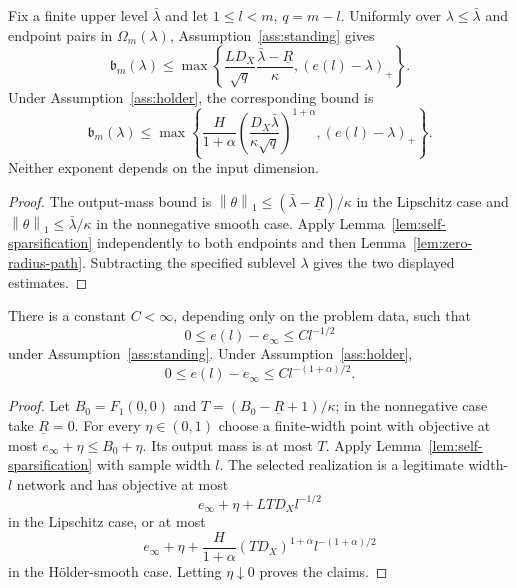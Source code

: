\documentclass[smallextended,envcountsect]{svjour3}
\newcommand{\norm}[1]{\left\lVert #1 \right\rVert}
\newcommand{\SubBar}{\mathfrak b}
\begin{document}
\begin{theorem}\label{thm:dimension-free-finite}
Fix a finite upper level $\bar\lambda$ and let $1\le l<m$, $q=m-l$.
Uniformly over $\lambda\le\bar\lambda$ and endpoint pairs in
$\Omega_m(\lambda)$, Assumption~\ref{ass:standing} gives
\begin{equation}
 \SubBar_m(\lambda)
 \le \max\left\{
 \frac{LD_X}{\sqrt q}\frac{\bar\lambda-\underline R}{\kappa},
 (e(l)-\lambda)_+
 \right\}.
 \label{eq:dimension-free-lipschitz-finite}
\end{equation}
Under Assumption~\ref{ass:holder}, the corresponding bound is
\begin{equation}
 \SubBar_m(\lambda)
 \le \max\left\{
 \frac{H}{1+\alpha}
 \left(\frac{D_X\bar\lambda}{\kappa\sqrt q}\right)^{1+\alpha},
 (e(l)-\lambda)_+
 \right\}.
 \label{eq:dimension-free-holder-finite}
\end{equation}
Neither exponent depends on the input dimension.
\end{theorem}

\begin{proof}
The output-mass bound is
$\norm{\theta}_1\le(\bar\lambda-\underline R)/\kappa$ in the Lipschitz case
and $\norm{\theta}_1\le\bar\lambda/\kappa$ in the nonnegative smooth case.
Apply Lemma~\ref{lem:self-sparsification} independently to both endpoints and
then Lemma~\ref{lem:zero-radius-path}.  Subtracting the specified sublevel
$\lambda$ gives the two displayed estimates.
\end{proof}

\begin{lemma}\label{lem:maurey}
There is a constant $C<\infty$, depending only on the problem data, such that
\begin{equation}
 0\le e(l)-e_\infty\le Cl^{-1/2}
 \label{eq:universal-approx-rate}
\end{equation}
under Assumption~\ref{ass:standing}.  Under
Assumption~\ref{ass:holder},
\begin{equation}
 0\le e(l)-e_\infty\le Cl^{-(1+\alpha)/2}.
 \label{eq:holder-approx-rate}
\end{equation}
\end{lemma}

\begin{proof}
Let $B_0=F_1(0,0)$ and
$T=(B_0-\underline R+1)/\kappa$; in the nonnegative case take
$\underline R=0$.  For every $\eta\in(0,1)$ choose a finite-width point with
objective at most $e_\infty+\eta\le B_0+\eta$.  Its output mass is at most
$T$.  Apply Lemma~\ref{lem:self-sparsification} with sample width $l$.
The selected realization is a legitimate width-$l$ network and has objective
at most
\[
 e_\infty+\eta+LTD_Xl^{-1/2}
\]
in the Lipschitz case, or at most
\[
 e_\infty+\eta+\frac{H}{1+\alpha}(TD_X)^{1+\alpha}
 l^{-(1+\alpha)/2}
\]
in the H\"older-smooth case.  Letting $\eta\downarrow0$ proves the claims.
\end{proof}
\end{document}
